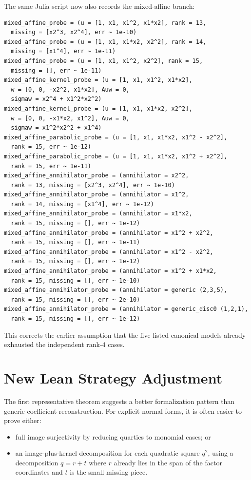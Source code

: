 \documentclass[11pt]{article}
\begin{document}
The same Julia script now also records the mixed-affine branch:
\begin{verbatim}
mixed_affine_probe = (u = [1, x1, x1^2, x1*x2], rank = 13,
  missing = [x2^3, x2^4], err ~ 1e-10)
mixed_affine_probe = (u = [1, x1, x1*x2, x2^2], rank = 14,
  missing = [x1^4], err ~ 1e-11)
mixed_affine_probe = (u = [1, x1, x1^2, x2^2], rank = 15,
  missing = [], err ~ 1e-11)
mixed_affine_kernel_probe = (u = [1, x1, x1^2, x1*x2],
  w = [0, 0, -x2^2, x1*x2], Auw = 0,
  sigmaw = x2^4 + x1^2*x2^2)
mixed_affine_kernel_probe = (u = [1, x1, x1*x2, x2^2],
  w = [0, 0, -x1*x2, x1^2], Auw = 0,
  sigmaw = x1^2*x2^2 + x1^4)
mixed_affine_parabolic_probe = (u = [1, x1, x1*x2, x1^2 - x2^2],
  rank = 15, err ~ 1e-12)
mixed_affine_parabolic_probe = (u = [1, x1, x1*x2, x1^2 + x2^2],
  rank = 15, err ~ 1e-11)
mixed_affine_annihilator_probe = (annihilator = x2^2,
  rank = 13, missing = [x2^3, x2^4], err ~ 1e-10)
mixed_affine_annihilator_probe = (annihilator = x1^2,
  rank = 14, missing = [x1^4], err ~ 1e-12)
mixed_affine_annihilator_probe = (annihilator = x1*x2,
  rank = 15, missing = [], err ~ 1e-12)
mixed_affine_annihilator_probe = (annihilator = x1^2 + x2^2,
  rank = 15, missing = [], err ~ 1e-11)
mixed_affine_annihilator_probe = (annihilator = x1^2 - x2^2,
  rank = 15, missing = [], err ~ 1e-12)
mixed_affine_annihilator_probe = (annihilator = x1^2 + x1*x2,
  rank = 15, missing = [], err ~ 1e-10)
mixed_affine_annihilator_probe = (annihilator = generic (2,3,5),
  rank = 15, missing = [], err ~ 2e-10)
mixed_affine_annihilator_probe = (annihilator = generic_disc0 (1,2,1),
  rank = 15, missing = [], err ~ 1e-12)
\end{verbatim}

This corrects the earlier assumption that the five listed canonical models
already exhausted the independent rank-$4$ cases.

\section*{New Lean Strategy Adjustment}
The first representative theorem suggests a better formalization pattern than
generic coefficient reconstruction. For explicit normal forms, it is often
easier to prove either:
\begin{itemize}
\item full image surjectivity by reducing quartics to monomial cases; or
\item an image-plus-kernel decomposition for each quadratic square
  $q^2$, using a decomposition $q = r + t$ where $r$ already lies in the span
  of the factor coordinates and $t$ is the small missing piece.
\end{itemize}
\end{document}
